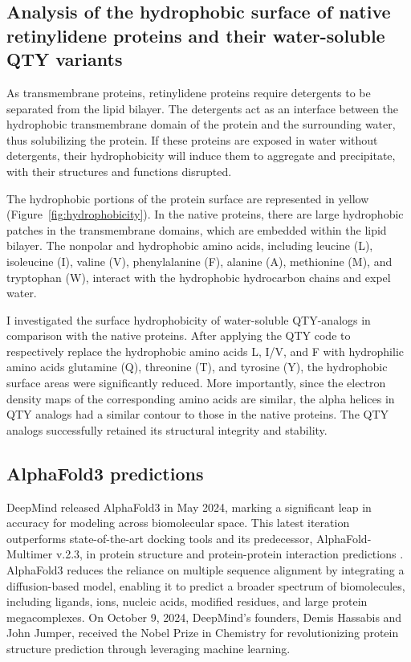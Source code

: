 \documentclass[fleqn, 10pt]{manuscript}
\begin{document}
\subsection*{Analysis of the hydrophobic surface of native retinylidene proteins and their water-soluble QTY variants}

As transmembrane proteins, retinylidene proteins require detergents to be separated from the lipid bilayer. The detergents act as an interface between the hydrophobic transmembrane domain of the protein and the surrounding water, thus solubilizing the protein. If these proteins are exposed in water without detergents, their hydrophobicity will induce them to aggregate and precipitate, with their structures and functions disrupted. 

The hydrophobic portions of the protein surface are represented in yellow (Figure~\ref{fig:hydrophobicity}). In the native proteins, there are large hydrophobic patches in the transmembrane domains, which are embedded within the lipid bilayer. The nonpolar and hydrophobic amino acids, including leucine (L), isoleucine (I), valine (V), phenylalanine (F), alanine (A), methionine (M), and tryptophan (W), interact with the hydrophobic hydrocarbon chains and expel water. 

I investigated the surface hydrophobicity of water-soluble QTY-analogs in comparison with the native proteins. After applying the QTY code to respectively replace the hydrophobic amino acids L, I/V, and F with hydrophilic amino acids glutamine (Q), threonine (T), and tyrosine (Y), the hydrophobic surface areas were significantly reduced. More importantly, since the electron density maps of the corresponding amino acids are similar, the alpha helices in QTY analogs had a similar contour to those in the native proteins. The QTY analogs successfully retained its structural integrity and stability. 

\subsection*{AlphaFold3 predictions}

DeepMind released AlphaFold3 in May 2024, marking a significant leap in accuracy for modeling across biomolecular space. This latest iteration outperforms state-of-the-art docking tools and its predecessor, AlphaFold-Multimer v.2.3, in protein structure and protein-protein interaction predictions \citep{Abramson_2024}. AlphaFold3 reduces the reliance on multiple sequence alignment by integrating a diffusion-based model, enabling it to predict a broader spectrum of biomolecules, including ligands, ions, nucleic acids, modified residues, and large protein megacomplexes. On October 9, 2024, DeepMind’s founders, Demis Hassabis and John Jumper, received the Nobel Prize in Chemistry for revolutionizing protein structure prediction through leveraging machine learning. 
\end{document}
